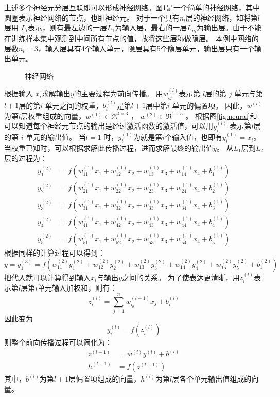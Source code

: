 上述多个神经元分层互联即可以形成神经网络。图\ref{fig:network}是一个简单的神经网络，其中圆圈表示神经网络的节点，也即神经元。
对于一个具有$n_l$层的神经网络，如将第$ l $层用 $ L_l$表示，则有最左边的一层$  L_1$为输入层，最右的一层$ L_{n_l} $为输出层。由于不能在训练样本集中观测到中间所有节点的值，故将这些层称做隐层。
本例中网络的层数$ n_l=3$，输入层具有4个输入单元，隐层具有5个隐层单元，输出层只有一个输出单元。

\begin{figure}
  \centering
  \sWuhao
  
  \caption{神经网络}
  \label{fig:network}
\end{figure}

根据输入 $x_i$求解输出$y$的主要过程为前向传播。
用$ w^{(l)}_{ij}$表示第 $ l $层的第 $ j$ 单元与第 $ l+1 $层的第$  i$ 单元之间的权重，$ b^{(l)}_i $是第$  l+1 $层中第$  i$ 单元的偏置项。
因此，$w^{(l)}$为第$l$层权重组成的向量，$ w^{(1)} \in \Re^{4\times 3}$ ， $ w^{(2)} \in \Re^{1\times 5}$ 。
根据图\ref{fig:neural}和可以知道每个神经元节点的输出是经过激活函数的激活值，可以用$ y^{(l)}_i$ 表示第$  l $层的第 $ i$ 单元的输出值。
当$  l=1$ 时，$  y^{(1)}_i$为就是第$  i $个输入值，也即有$  y^{(1)}_i = x_i $。
当权重已知时，可以根据求解此传播过程，进而求解最终的输出值$y$。
从$L_1$层到$L_2$层的过程为：
\begin{align}
  y_1^{(2)} &= f(w_{11}^{(1)}x_1 + w_{12}^{(1)} x_2 + w_{13}^{(1)} x_3 + w_{14}^{(1)} x_4 + b_1^{(1)})  \\
  y_2^{(2)} &= f(w_{21}^{(1)}x_1 + w_{22}^{(1)} x_2 + w_{23}^{(1)} x_3 + w_{24}^{(1)} x_4 + b_2^{(1)})  \\
  y_3^{(2)} &= f(w_{31}^{(1)}x_1 + w_{32}^{(1)} x_2 + w_{33}^{(1)} x_3 + w_{34}^{(1)} x_4 + b_3^{(1)})  \\
  y_4^{(2)} &= f(w_{41}^{(1)}x_1 + w_{42}^{(1)} x_2 + w_{43}^{(1)} x_3 + w_{44}^{(1)} x_4 + b_4^{(1)})  \\
  y_5^{(2)} &= f(w_{51}^{(1)}x_1 + w_{52}^{(1)} x_2 + w_{53}^{(1)} x_3 + w_{54}^{(1)} x_4 + b_5^{(1)})
  \label{equ:fp1}
\end{align}
根据同样的计算过程可以得到：
\begin{equation}
  y = y_1^{(3)} =  f(w_{11}^{(2)} y_1^{(2)} + w_{12}^{(2)} y_2^{(2)} + w_{13}^{(2)} y_3^{(2)} + w_{14}^{(2)} y_4^{(2)} + w_{15}^{(2)} y_5^{(2)} + b_1^{(2)})
  \label{equ:fp2}
\end{equation}
把代入就可以计算得到输入$x_i$与输出$y$之间的关系。
为了使表达更清晰，用$ z^{(l)}_i $表示第$ l $层第$  i$单元输入加权和，则有：
\begin{equation}
  z_i^{(l)} = \sum_{j=1}^n w^{(l-1)}_{ij} x_j + b^{(l)}_i
\end{equation}
因此变为
\begin{equation}
  y^{(l)}_i = f(z^{(l)}_i)
\end{equation}
则整个前向传播过程可以简化为：
\begin{align}
  z^{(l+1)} &= w^{(l)} y^{(l)} + b^{(l)}   \\
  h^{(l+1)} &= f(z^{(l+1)})
\end{align}
其中，$b^{(l)}$为第$l+1$层偏置项组成的向量，$h^{(l)}$为第$l$层各个单元输出值组成的向量。

